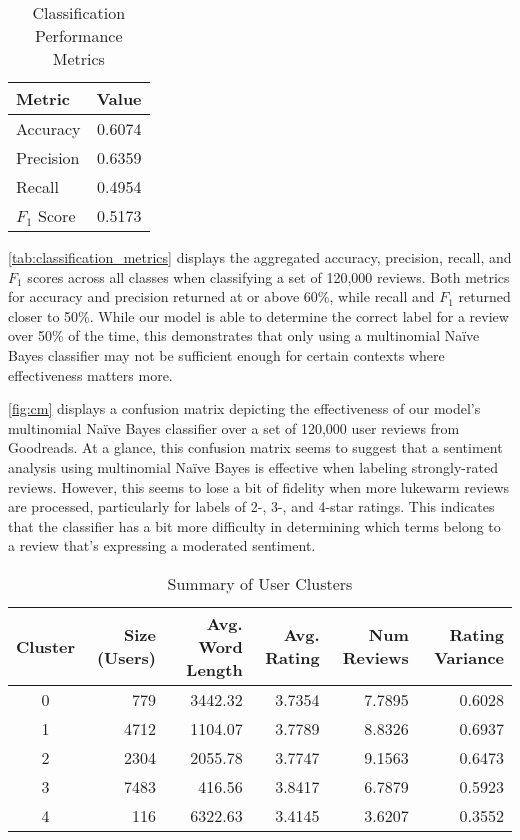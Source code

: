 \begin{table}[h]
	\renewcommand{\arraystretch}{1.3}
	\caption{Classification Performance Metrics}
	\label{tab:classification_metrics}
	\centering
	\begin{tabular}{l r}
		\hline
		\textbf{Metric} & \textbf{Value} \\
		\hline
		Accuracy  & 0.6074 \\
		Precision & 0.6359 \\
		Recall    & 0.4954 \\
		\(F_1\) Score  & 0.5173 \\
		\hline
	\end{tabular}
\end{table}

\autoref{tab:classification_metrics} displays the aggregated accuracy, precision, recall, and \(F_1\) scores across all classes when classifying a set of 120,000 reviews.
Both metrics for accuracy and precision returned at or above 60\%, while recall and \(F_1\) returned closer to 50\%.
While our model is able to determine the correct label for a review over 50\% of the time,
this demonstrates that only using a multinomial Na\"ive Bayes classifier may not be sufficient enough for certain contexts where
effectiveness matters more.

\autoref{fig:cm} displays a confusion matrix depicting the effectiveness of our model's multinomial Na\"ive Bayes classifier over a set of 120,000 user reviews from Goodreads.
At a glance, this confusion matrix seems to suggest that a sentiment analysis using multinomial Na\"ive Bayes is effective when labeling strongly-rated reviews.
However, this seems to lose a bit of fidelity when more lukewarm reviews are processed, particularly for labels of 2-, 3-, and 4-star ratings. This indicates that the classifier has a bit more difficulty in determining which terms belong to a review that's expressing a moderated sentiment.

\begin{table*}[!t]
	\renewcommand{\arraystretch}{1.3}
	\caption{Summary of User Clusters}
	\label{tab:user_clusters}
	\centering
	\begin{tabular}{c r r r r r}
		\hline
		\textbf{Cluster} & \textbf{Size (Users)} & \textbf{Avg. Word Length} & \textbf{Avg. Rating} & \textbf{Num Reviews} & \textbf{Rating Variance} \\
		\hline
		0 & 779  & 3442.32 & 3.7354 & 7.7895 & 0.6028 \\
		1 & 4712 & 1104.07 & 3.7789 & 8.8326 & 0.6937 \\
		2 & 2304 & 2055.78 & 3.7747 & 9.1563 & 0.6473 \\
		3 & 7483 &  416.56 & 3.8417 & 6.7879 & 0.5923 \\
		4 & 116  & 6322.63 & 3.4145 & 3.6207 & 0.3552 \\
		\hline
	\end{tabular}
\end{table*}


